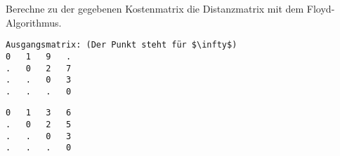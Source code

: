 ﻿\question[4]
Berechne zu der gegebenen Kostenmatrix die Distanzmatrix
mit dem Floyd-Algorithmus.

\begin{lstlisting}
Ausgangsmatrix: (Der Punkt steht für $\infty$)
0   1   9   .
.   0   2   7
.   .   0   3
.   .   .   0
\end{lstlisting}

\begin{solutionbox}{6cm}
\begin{lstlisting}
0   1   3   6
.   0   2   5
.   .   0   3
.   .   .   0
\end{lstlisting}
\end{solutionbox}
